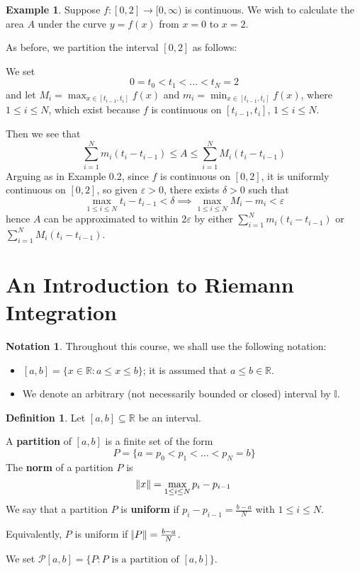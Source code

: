 \documentclass[11pt]{article}
\theoremstyle{definition}
\newtheorem{defn}[thm]{Definition}
\newtheorem{exmp}[thm]{Example}
\newtheorem{notation}[thm]{Notation}
\newcommand{\mbR}{\ensuremath{\mathbb{R}}}
\begin{document}
\begin{exmp}
Suppose $f : [0, 2] \to [0, \infty)$ is continuous. We wish to calculate the area $A$ under the curve $y = f(x)$ from $x = 0$ to $x = 2$. 

As before, we partition the interval $[0, 2]$ as follows: 

We set 
$$0 = t_0 < t_1 < \dots < t_N = 2$$
and let $M_i = \max_{x \in [t_{i-1}, t_i]} f(x)$ and $m_i = \min_{x \in [t_{i-1}, t_i]} f(x)$, where $1 \leq i \leq N$, which exist because $f$ is continuous on $[t_{i-1}, t_i]$, $1 \leq i \leq N$. 

Then we see that
$$\sum_{i=1}^N m_i (t_i - t_{i-1}) \leq A \leq \sum_{i=1}^N M_i (t_i - t_{i-1})$$
Arguing as in Example 0.2, since $f$ is continuous on $[0, 2]$, it is uniformly continuous on $[0, 2]$, so given $\varepsilon > 0$, there exists $\delta > 0$ such that
$$\max_{1 \leq i \leq N} t_i - t_{i-1} < \delta \implies \max_{1 \leq i \leq N} M_i - m_i < \varepsilon$$
hence $A$ can be approximated to within $2\varepsilon$ by either $\sum_{i=1}^N m_i(t_i - t_{i-1})$ or $\sum_{i=1}^N M_i(t_i - t_{i-1})$.
\end{exmp}

\newpage

\section{An Introduction to Riemann Integration}

\begin{notation}
Throughout this course, we shall use the following notation: \vspace{-0.2cm}
\begin{itemize}
\item $[a, b] = \{x \in \mbR : a \leq x \leq b\}$; it is assumed that $a \leq b \in \mbR$.
\item We denote an arbitrary (not necessarily bounded or closed) interval by $\mathds{I}$.
\end{itemize}
\end{notation}

\begin{defn}
Let $[a, b] \subseteq \mbR$ be an interval. 

A \textbf{partition} of $[a, b]$ is a finite set of the form 
$$P = \{a = p_0 < p_1 < \dots < p_N = b\}$$
The \textbf{norm} of a partition $P$ is
$$\norm{x} = \max_{1 \leq i \leq N} p_i - p_{i-1}$$
We say that a partition $P$ is \textbf{uniform} if $p_i - p_{i-1} = \frac{b-a}N$ with $1 \leq i \leq N$. 

Equivalently, $P$ is uniform if $\norm{P} = \frac{b-a}N$.

We set $\mathcal{P}[a, b] = \{P : P \text{ is a partition of } [a, b]\}$.
\end{defn}
\end{document}
